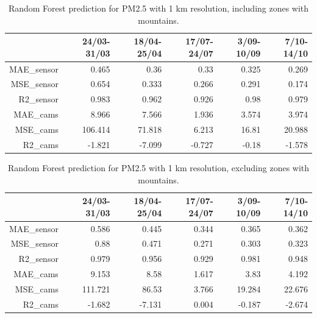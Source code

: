 \begin{table}[H]
\begin{tabular}{rrrrrr}
\hline
     &   24/03-31/03 &   18/04-25/04 &   17/07-24/07 &   3/09-10/09 &   7/10-14/10 \\
\hline
   MAE\_sensor   &            0.465 &            0.36  &            0.33  &            0.325 &            0.269 \\
  MSE\_sensor   &            0.654 &            0.333 &            0.266 &            0.291 &            0.174 \\
   R2\_sensor    &            0.983 &            0.962 &            0.926 &            0.98  &            0.979 \\
   MAE\_cams     &            8.966 &            7.566 &            1.936 &            3.574 &            3.974 \\
  MSE\_cams     &          106.414 &           71.818 &            6.213 &           16.81  &           20.988 \\
   R2\_cams      &           -1.821 &           -7.099 &           -0.727 &           -0.18  &           -1.578 \\
\hline
\end{tabular}
\caption{Random Forest prediction for PM2.5 with 1 km resolution, including zones with mountains.}
\end{table}


\begin{table}[H]
\begin{tabular}{rrrrrr}
\hline
      &   24/03-31/03 &   18/04-25/04 &   17/07-24/07 &   3/09-10/09 &   7/10-14/10 \\
\hline
  MAE\_sensor   &            0.586 &            0.445 &            0.344 &            0.365 &            0.362 \\
   MSE\_sensor   &            0.88  &            0.471 &            0.271 &            0.303 &            0.323 \\
  R2\_sensor    &            0.979 &            0.956 &            0.929 &            0.981 &            0.948 \\
  MAE\_cams     &            9.153 &            8.58  &            1.617 &            3.83  &            4.192 \\
   MSE\_cams     &          111.721 &           86.53  &            3.766 &           19.284 &           22.676 \\
  R2\_cams      &           -1.682 &           -7.131 &            0.004 &           -0.187 &           -2.674 \\
\hline
\end{tabular}
\caption{Random Forest prediction for PM2.5 with 1 km resolution, excluding zones with mountains.}
\end{table}

